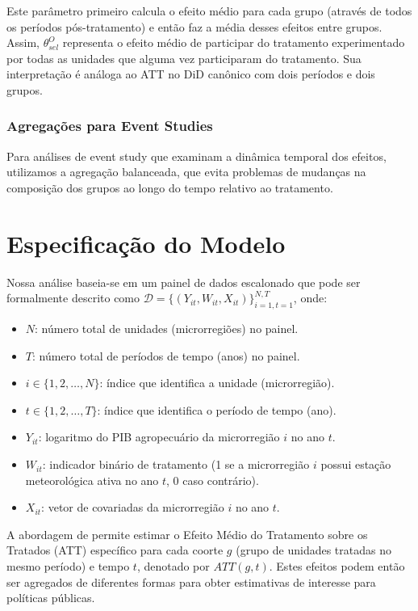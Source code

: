 \documentclass[
	12pt,				%
	oneside,			%
	a4paper,			%
	english,			%
	french,				%
	spanish,			%
	brazil				%
	]{abntex2}
\begin{document}
Este parâmetro primeiro calcula o efeito médio para cada grupo (através de todos os períodos pós-tratamento) e então faz a média desses efeitos entre grupos. Assim, $\theta^O_{sel}$ representa o efeito médio de participar do tratamento experimentado por todas as unidades que alguma vez participaram do tratamento. Sua interpretação é análoga ao ATT no DiD canônico com dois períodos e dois grupos.

\subsubsection{Agregações para Event Studies}

Para análises de event study que examinam a dinâmica temporal dos efeitos, utilizamos a agregação balanceada, que evita problemas de mudanças na composição dos grupos ao longo do tempo relativo ao tratamento.

\section{Especificação do Modelo}

Nossa análise baseia-se em um painel de dados escalonado que pode ser formalmente descrito como $\mathcal{D} = \{(Y_{it}, W_{it}, X_{it})\}_{i=1,t=1}^{N,T}$, onde:

\begin{itemize}
\item $N$: número total de unidades (microrregiões) no painel.
\item $T$: número total de períodos de tempo (anos) no painel.
\item $i \in \{1, 2, \ldots, N\}$: índice que identifica a unidade (microrregião).
\item $t \in \{1, 2, \ldots, T\}$: índice que identifica o período de tempo (ano).
\item $Y_{it}$: logaritmo do PIB agropecuário da microrregião $i$ no ano $t$.
\item $W_{it}$: indicador binário de tratamento (1 se a microrregião $i$ possui estação meteorológica ativa no ano $t$, 0 caso contrário).
\item $X_{it}$: vetor de covariadas da microrregião $i$ no ano $t$.
\end{itemize}

A abordagem de  permite estimar o Efeito Médio do Tratamento sobre os Tratados (ATT) específico para cada coorte $g$ (grupo de unidades tratadas no mesmo período) e tempo $t$, denotado por $ATT(g,t)$. Estes efeitos podem então ser agregados de diferentes formas para obter estimativas de interesse para políticas públicas.
\end{document}
